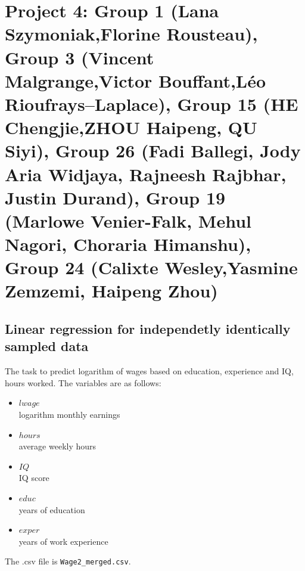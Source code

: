 \documentclass{article}
\begin{document}
\section*{Project 4: Group 1 (Lana Szymoniak,Florine Rousteau), Group 3 (Vincent Malgrange,Victor Bouffant,Léo Rioufrays--Laplace),
Group 15 (HE Chengjie,ZHOU Haipeng, QU Siyi), Group 26 (Fadi Ballegi, Jody Aria Widjaya, Rajneesh Rajbhar, Justin Durand),
Group 19 (Marlowe Venier-Falk, Mehul Nagori, Choraria Himanshu), Group 24 (Calixte Wesley,Yasmine Zemzemi, Haipeng Zhou)
}
 \subsection*{Linear regression for independetly identically sampled data}
   The task to predict logarithm of wages based on education, experience and IQ, hours worked. The variables are as follows:
   \begin{itemize}
   \item{$lwage$ \\}                    logarithm monthly earnings
   \item{$hours$ \\}                    average weekly hours
   \item{$IQ$ \\}                      IQ score
   \item{$educ$ \\}                     years of education
   \item{$exper$ \\}                    years of work experience
   \end{itemize}


   The .csv file is \lstinline$Wage2_merged.csv$.
\end{document}

